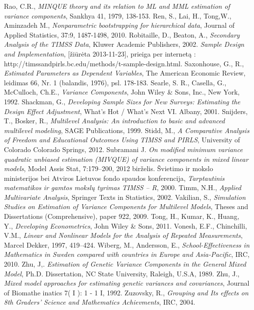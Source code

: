 \documentclass[12pt,a4paper]{article}
\begin{document}
\begin{thebibliography}{1}
 Rao, C.R., \textit{MINQUE theory and its relation to ML and MML estimation of variance components}, Sankhya 41, 1979, 138-153.
 Ren, S., Lai, H., Tong,W., Aminzadeh M., \textit{Nonparametric bootstrapping for hierarchical data}, Journal of Applied Statistics, 37:9, 1487-1498, 2010.
 Robitaille, D., Beaton, A., \textit{Secondary Analysis of the TIMSS Data}, Kluwer Academic Publishers, 2002.
 \textit{Sample Design and Implementation}, [žiūrėta 2013-11-23], prieiga per internetą : http://timssandpirls.bc.edu/methods/t-sample-design.html.
 Saxonhouse, G., R., \textit{Estimated Parameters as Dependent Variables}, The American Economic Review,
leidimas 66, Nr. 1 (balandis, 1976), psl. 178-183.
 Searle, S. R., Casella, G., McCulloch, Ch.E., \textit{Variance Components}, John Wiley \& Sons, Inc., New York, 1992.
 Shackman, G., \textit{Developing Sample Sizes for New Surveys: Estimating the Design Effect Adjustment}, What’s Hot / What’s Next VI. Albany, 2001.
 Snijders, T., Bosker, R., \textit{Multilevel Analysis: An introduction to basic and advanced multilevel modeling}, SAGE Publications, 1999.
 Stidd, M., \textit{A Comparative Analysis of Freedom and Educational Outcomes Using TIMSS and PIRLS}, University of Colorado Colorado Springs, 2012.
Subramani J. \textit{On modified minimum variance quadratic unbiased estimation (MIVQUE) of variance components in mixed linear models}, Model Assis Stat, 7:179–200, 2012 birželis.
 Švietimo ir mokslo ministerijos bei Atviros Lietuvos fondo spaudos konferencija, \textit{Tarptautinis matematikos ir gamtos mokslų tyrimas TIMSS – R}, 2000.
Timm, N.H., \textit{Applied Multivariate Analysis}, Springer Texts in Statistics, 2002.
 Vakilian, S., \textit{Simulation Studies on Estimation of Variance Components for Multilevel Models}, Theses and Dissertations (Comprehensive), paper 922, 2009.
 Tong, H., Kumar, K., Huang, Y., \textit{Developing Econometrics}, John Wiley \& Sons, 2011.
 Vonesh, E.F., Chinchilli, V.M., \textit{ Linear and Nonlinear Models for the Analysis of Repeated Measurements}, Marcel Dekker, 1997, 419–424.
 Wiberg, M., Andersson, E., \textit{School-Effectiveness in Mathematics in Sweden compared with countries in Europe and Asia-Pacific}, IRC, 2010.
 Zhu, J,. \textit{Estimation of Genetic Variance Components in the General Mixed Model},  Ph.D.
Dissertation, NC State University, Raleigh, U.S.A, 1989.   
 Zhu, J.,  \textit{Mixed model approaches for estimating genetic variances and covariances}, Journal of Biomathe inatics 7( I ): 1 - 1 I, 1992.
 Zuzovsky, R., \textit{Grouping and Its effects on 8th Graders' Science and Mathematics Achievments}, IRC, 2004.
\end{thebibliography}
\end{document}
